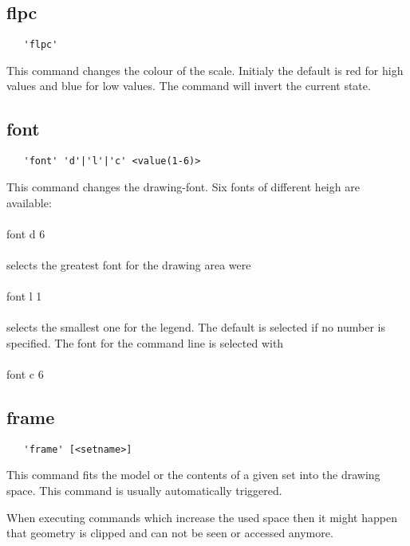 \documentclass{article}
\begin{document}
\subsection{\label{flpc}flpc}
\begin{verbatim}
   'flpc'
\end{verbatim}
This command changes the colour of the scale. Initialy the default is red for high values and blue for low values. The command will invert the current state.

\subsection{\label{font}font}
\begin{verbatim}
   'font' 'd'|'l'|'c' <value(1-6)>
\end{verbatim}
This command changes the drawing-font. Six fonts of different heigh are available:
\\\\font d 6\\\\selects the greatest font for the drawing area were\\\\font l 1\\\\selects the smallest one for the legend. The default is selected if no number is specified. The font for the command line is selected with\\\\font c 6

\subsection{\label{frame}frame}
\begin{verbatim}
   'frame' [<setname>]
\end{verbatim}
This command fits the model or the contents of a given set into the drawing space. This command is usually automatically triggered. 

When executing commands which increase the used space then it might happen that geometry is clipped and can not be seen or accessed anymore. 
\end{document}
